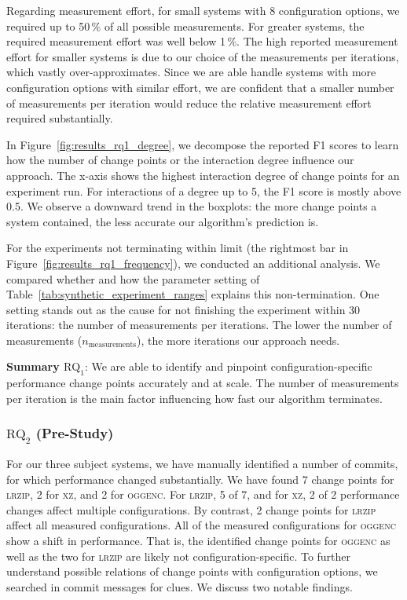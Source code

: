 \documentclass[sigconf]{acmart}
\newcommand{\greybox}[1]{
	\begin{mdframed}[backgroundcolor=black!10!white,linewidth=0pt,backgroundcolor=black!10,linewidth=0pt,innerleftmargin=5pt,innertopmargin=5pt]
		#1
	\end{mdframed}
}
\begin{document}
	Regarding measurement effort, for small systems with 8 configuration options, we required up to 50\,\% of all possible measurements. For greater systems, the required measurement effort was well below 1\,\%. The high reported measurement effort for smaller systems is due to our choice of the measurements per iterations, which vastly over-approximates. Since we are able handle systems with more configuration options with similar effort, we are confident that a smaller number of measurements per iteration would reduce the relative measurement effort required substantially.
	
	In Figure~\ref{fig:results_rq1_degree}, we decompose the reported F1 scores to learn how the number of change points or the interaction degree influence our approach. The x-axis shows the highest interaction degree of change points for an experiment run. For interactions of a degree up to 5, the F1 score is mostly above 0.5. We observe a downward trend in the boxplots: the more change points a system contained, the less accurate our algorithm's prediction is.
	
	For the experiments not terminating within limit (the rightmost bar in Figure~\ref{fig:results_rq1_frequency}), we conducted an additional analysis. We compared whether and how the parameter setting of Table~\ref{tab:synthetic_experiment_ranges} explains this non-termination. One setting stands out as the cause for not finishing the experiment within 30 iterations: the number of measurements per iterations. The lower the number of measurements ($n_\text{measurements}$), the more iterations our approach needs.
	\vspace{2mm}
	\greybox{
		\textbf{Summary $\text{RQ}_1$}: We are able to identify and pinpoint config\-uration-specific performance change points accurately and at scale. The number of measurements per iteration is the main factor influencing how fast our algorithm terminates.
	}
	
	\subsubsection{$\text{RQ}_2$ (Pre-Study)}
	For our three subject systems, we have manually identified a number of commits, for which performance chang\-ed substantially. We have found 7 change points for \textsc{lrzip}, 2 for \textsc{xz}, and 2 for \textsc{oggenc}. For \textsc{lrzip}, 5 of 7, and for \textsc{xz}, 2 of 2 performance changes affect multiple configurations. By contrast, 2 change points for \textsc{lrzip} affect all measured configurations. All of the measured configurations for \textsc{oggenc} show a shift in performance. That is, the identified change points for \textsc{oggenc} as well as the two for \textsc{lrzip} are likely not configuration-specific. 	
	To further understand possible relations of change points with configuration options, we searched in commit messages for clues. We discuss two notable findings. 
	
\end{document}
